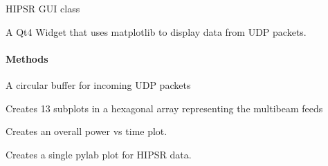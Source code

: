 \documentclass[letterpaper,10pt,english]{sphinxmanual}
\begin{document}
\begin{fulllineitems}
\label{software:hipsr_gui.HipsrGui}
HIPSR GUI class

A Qt4 Widget that uses matplotlib to display data from UDP packets.
\paragraph{Methods}

\begin{fulllineitems}
\label{software:hipsr_gui.HipsrGui.bufferUDPData}
A circular buffer for incoming UDP packets

\end{fulllineitems}


\begin{fulllineitems}
\label{software:hipsr_gui.HipsrGui.createMultiBeamPlot}
Creates 13 subplots in a hexagonal array representing the multibeam feeds

\end{fulllineitems}


\begin{fulllineitems}
\label{software:hipsr_gui.HipsrGui.createOverallPowerPlot}
Creates an overall power vs time plot.

\end{fulllineitems}


\begin{fulllineitems}
\label{software:hipsr_gui.HipsrGui.createSingleBeamPlot}
Creates a single pylab plot for HIPSR data.

\end{fulllineitems}



\end{fulllineitems}
\end{document}
